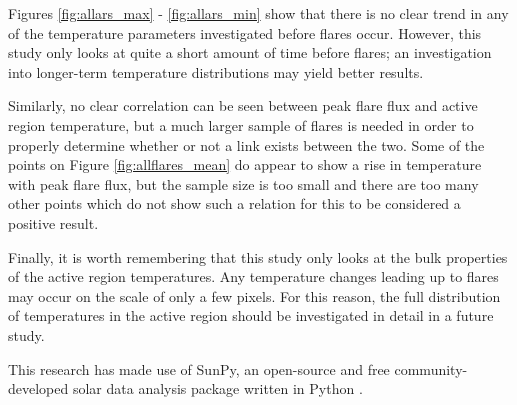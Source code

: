 \documentclass[referee,a4paper,12pt]{swsc}
\begin{document}
\begin{linenumbers}
Figures \ref{fig:allars_max} - \ref{fig:allars_min} show that there is no clear trend in any of the temperature parameters investigated before flares occur.
However, this study only looks at quite a short amount of time before flares; an investigation into longer-term temperature distributions may yield better results.

Similarly, no clear correlation can be seen between peak flare flux and active region temperature, but a much larger sample of flares is needed in order to properly determine whether or not a link exists between the two.
Some of the points on Figure \ref{fig:allflares_mean} do appear to show a rise in temperature with peak flare flux, but the sample size is too small and there are too many other points which do not show such a relation for this to be considered a positive result.

Finally, it is worth remembering that this study only looks at the bulk properties of the active region temperatures.
Any temperature changes leading up to flares may occur on the scale of only a few pixels.
For this reason, the full distribution of temperatures in the active region should be investigated in detail in a future study.

\begin{acknowledgements}
	This research has made use of SunPy, an open-source and free community-developed solar data analysis package written in Python \citep{Mumford2013}.
\end{acknowledgements}




\end{linenumbers}
\end{document}
